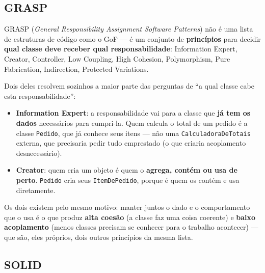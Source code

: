 \subsection{GRASP}

\begin{conceito}
GRASP (\textit{General Responsibility Assignment Software Patterns}) não é
uma lista de estruturas de código como o GoF --- é um conjunto de
\textbf{princípios} para decidir \textbf{qual classe deve receber qual
responsabilidade}: Information Expert, Creator, Controller, Low Coupling,
High Cohesion, Polymorphism, Pure Fabrication, Indirection, Protected
Variations.

Dois deles resolvem sozinhos a maior parte das perguntas de “a qual classe
cabe esta responsabilidade”:

\begin{itemize}
\item \textbf{Information Expert}: a responsabilidade vai para a classe
que \textbf{já tem os dados} necessários para cumpri-la. Quem calcula o
total de um pedido é a classe \texttt{Pedido}, que já conhece seus itens
--- não uma \texttt{CalculadoraDeTotais} externa, que precisaria pedir
tudo emprestado (o que criaria acoplamento desnecessário).
\item \textbf{Creator}: quem cria um objeto é quem o \textbf{agrega,
contém ou usa de perto}. \texttt{Pedido} cria seus \texttt{ItemDePedido},
porque é quem os contém e usa diretamente.
\end{itemize}

Os dois existem pelo mesmo motivo: manter juntos o dado e o comportamento
que o usa é o que produz \textbf{alta coesão} (a classe faz uma coisa
coerente) e \textbf{baixo acoplamento} (menos classes precisam se conhecer
para o trabalho acontecer) --- que são, eles próprios, dois outros
princípios da mesma lista.
\end{conceito}

\subsection{SOLID}
\label{sec:solid-uml}

